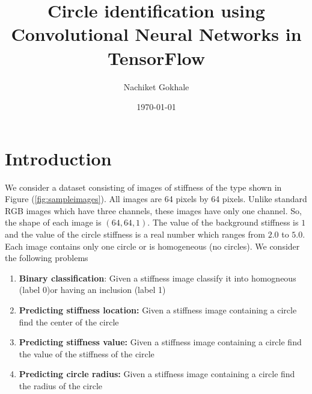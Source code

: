 \documentclass{article}
\begin{document}
\title{Circle identification using Convolutional Neural Networks in TensorFlow}
\author{Nachiket Gokhale}
\date{\today}
\maketitle
\section{Introduction}
We consider a dataset consisting of images of stiffness of the type shown in Figure (\ref{fig:sampleimages}). All images are 64 pixels by 64 pixels. Unlike standard RGB images which have three channels, these images have only one channel. So, the shape of each image is $(64,64,1)$. The value of the background stiffness is $1$ and the value of the circle stiffness is a real number which ranges from $2.0$ to $5.0$. Each image contains only one circle or is homogeneous (no circles). We consider the following problems
\begin{enumerate}
\item{\textbf{Binary classification}: Given a stiffness image classify it into homogneous (label 0)or having an inclusion (label 1)}
\item{\textbf{Predicting stiffness location:} Given a stiffness image containing a circle find the center of the circle}
\item{\textbf{Predicting stiffness value:} Given a stiffness image containing a circle find the value of the stiffness of the circle}
\item{\textbf{Predicting circle radius:} Given a stiffness image containing a circle find the radius of the circle}
\end{enumerate}
\end{document}

